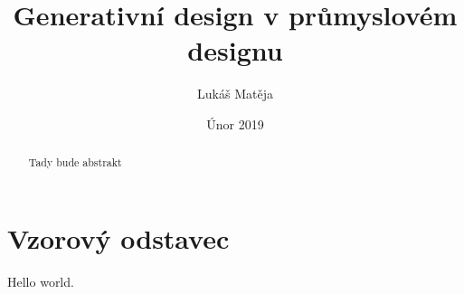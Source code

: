 \documentclass[10pt,a4paper,twoside,titlepage,draft]{report}
\begin{document}
\title{Generativní design v průmyslovém designu}
\author{Lukáš Matěja}
\date{Únor 2019}
\maketitle

\begin{abstract}
Tady bude abstrakt
\end{abstract}

\chapter{Vzorový odstavec}

Hello world.
\end{document}
